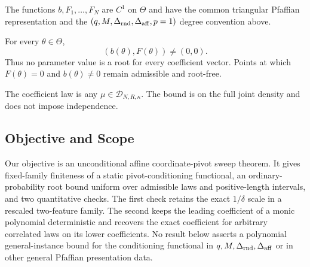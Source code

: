 \begin{assumption}
\label{assump:shared-pfaffian-chain}
The functions $b,F_1,\ldots,F_N$ are $C^1$ on $\Theta$ and have the common
triangular Pfaffian representation and the
$(q,M,\Delta_{\rm rnd},\Delta_{\rm aff},p=1)$ degree convention above.
\end{assumption}

\begin{assumption}
\label{assump:no-forced-root}
For every $\theta\in\Theta$,
\[
(b(\theta),F(\theta))\neq(0,0).
\]
Thus no parameter value is a root for every coefficient vector.  Points at
which $F(\theta)=0$ and $b(\theta)\neq0$ remain admissible and root-free.
\end{assumption}

\begin{assumption}
\label{assump:joint-density-cap}
The coefficient law is any $\mu\in\mathcal D_{N,R,\kappa}$.  The bound is
on the full joint density and does not impose independence.
\end{assumption}

\subsection{Objective and Scope}

Our objective is an unconditional affine coordinate-pivot sweep theorem.
It gives fixed-family finiteness of a static pivot-conditioning functional,
an ordinary-probability root bound uniform over admissible laws and
positive-length intervals, and two quantitative checks.  The first check
retains the exact $1/\delta$ scale in a rescaled two-feature family.  The
second keeps the leading coefficient of a monic polynomial deterministic
and recovers the exact coefficient for arbitrary correlated laws on its
lower coefficients.  No result below asserts a polynomial general-instance
bound for the conditioning functional in
$q,M,\Delta_{\rm rnd},\Delta_{\rm aff}$ or in other general Pfaffian
presentation data.

